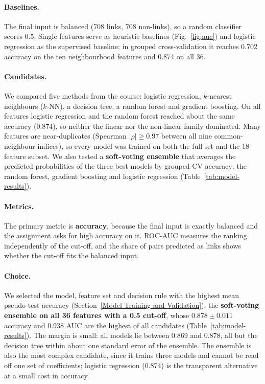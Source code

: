 \documentclass[runningheads]{llncs}
\begin{document}
\paragraph{Baselines.} The final input is balanced (708 links, 708 non-links), so a random classifier scores 0.5. Single features serve as heuristic baselines (Fig.~\ref{fig:auc}) and logistic regression as the supervised baseline: in grouped cross-validation it reaches 0.702 accuracy on the ten neighbourhood features and 0.874 on all 36.

\paragraph{Candidates.} We compared five methods from the course: logistic regression, $k$-nearest neighbours ($k$-NN), a decision tree, a random forest and gradient boosting. On all features logistic regression and the random forest reached about the same accuracy (0.874), so neither the linear nor the non-linear family dominated. Many features are near-duplicates (Spearman $|\rho| \geq 0.97$ between all nine common-neighbour indices), so every model was trained on both the full set and the 18-feature subset. We also tested a \textbf{soft-voting ensemble} that averages the predicted probabilities of the three best models by grouped-CV accuracy: the random forest, gradient boosting and logistic regression (Table~\ref{tab:model-results}).

\paragraph{Metrics.} The primary metric is \textbf{accuracy}, because the final input is exactly balanced and the assignment asks for high accuracy on it. ROC-AUC measures the ranking independently of the cut-off, and the share of pairs predicted as links shows whether the cut-off fits the balanced input.

\paragraph{Choice.} We selected the model, feature set and decision rule with the highest mean pseudo-test accuracy (Section~\ref{Model Training and Validation}): the \textbf{soft-voting ensemble on all 36 features with a 0.5 cut-off}, whose $0.878 \pm 0.011$ accuracy and 0.938 AUC are the highest of all candidates (Table~\ref{tab:model-results}). The margin is small: all models lie between 0.869 and 0.878, all but the decision tree within about one standard error of the ensemble. The ensemble is also the most complex candidate, since it trains three models and cannot be read off one set of coefficients; logistic regression (0.874) is the transparent alternative at a small cost in accuracy.
\end{document}

